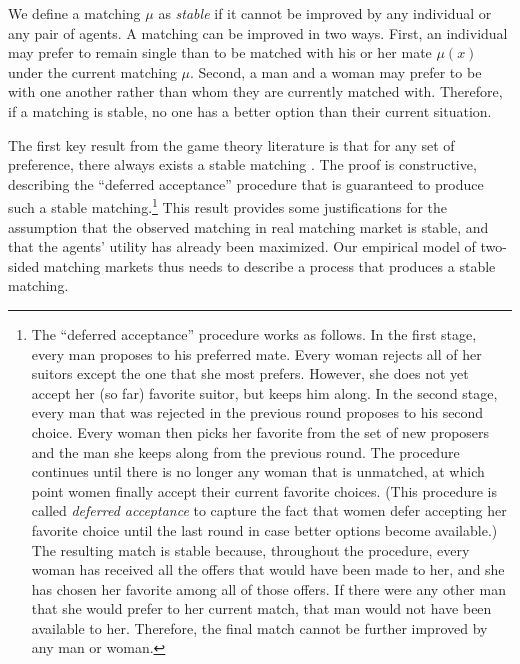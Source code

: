We define a matching $\mu$ as \textit{stable} if it cannot be improved by any
individual or any pair of agents. A matching can be improved in two ways. First,
an individual may prefer to remain single than to be matched with his or her
mate $\mu(x)$ under the current matching $\mu$. Second, a man and a woman may
prefer to be with one another rather than whom they are currently matched with.
Therefore, if a matching is stable, no one has a better option than their
current situation.

The first key result from the game theory literature is that for any set of
preference, there always exists a stable matching \citep{Gale1962}. The proof is
constructive, describing the ``deferred acceptance'' procedure that is
guaranteed to produce such a stable matching.\footnote{The ``deferred
  acceptance'' procedure works as follows. In the first stage, every man
  proposes to his preferred mate. Every woman rejects all of her suitors except
  the one that she most prefers. However, she does not yet accept her (so far)
  favorite suitor, but keeps him along. In the second stage, every man that was
  rejected in the previous round proposes to his second choice. Every woman then
  picks her favorite from the set of new proposers and the man she keeps along
  from the previous round. The procedure continues until there is no longer any
  woman that is unmatched, at which point women finally accept their current
  favorite choices. (This procedure is called \textit{deferred acceptance} to
  capture the fact that women defer accepting her favorite choice until the last
  round in case better options become available.) The resulting match is stable
  because, throughout the procedure, every woman has received all the offers
  that would have been made to her, and she has chosen her favorite among all of
  those offers. If there were any other man that she would prefer to her current
  match, that man would not have been available to her. Therefore, the final
  match cannot be further improved by any man or woman.} This result provides
some justifications for the assumption that the observed matching in real
matching market is stable, and that the agents' utility has already been
maximized. Our empirical model of two-sided matching markets thus needs to
describe a process that produces a stable matching.

